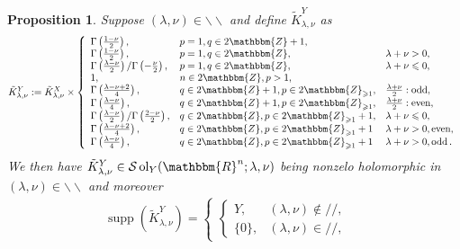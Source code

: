 \documentclass[12pt]{article}
\newcommand{\assign}{:=}
\newcommand{\nin}{\not\in}
\newcommand{\tmop}[1]{\ensuremath{\operatorname{#1}}}
\newtheorem{proposition}{Proposition}[section]
\theoremstyle{remark}
\begin{document}
\begin{proposition}
  \label{supp-sing:prop-supp-Y}Suppose $(\lambda, \nu) \in
  \backslash\backslash$ and define $\tilde{K}_{\lambda, \nu}^Y$ as
  \[ \tilde{K}^Y_{\lambda, \nu} \assign \tilde{K}_{\lambda, \nu}^X \times
     \left\{ \begin{array}{lll}
       \Gamma \left( \frac{1 - \nu}{2} \right), & p = 1, q \in 2\mathbbm{Z}+
       1, & \\
       \Gamma \left( \frac{1 - \nu}{2} \right), & p = 1, q \in 2\mathbbm{Z}, &
       \lambda + \nu > 0,\\
       \Gamma \left( \frac{\lambda - \nu}{2} \right) / \Gamma \left( -
       \frac{\nu}{2} \right), & p = 1, q \in 2\mathbbm{Z}, & \lambda + \nu
       \leqslant 0,\\
       1, & n \in 2\mathbbm{Z}, p > 1, & \\
       \Gamma \left( \frac{\lambda - \nu + 2}{4} \right), & q \in
       2\mathbbm{Z}+ 1, p \in 2\mathbbm{Z}_{\geqslant 1}, & \frac{\lambda +
       \nu}{2} : \tmop{odd},\\
       \Gamma \left( \frac{\lambda - \nu}{4} \right), & q \in 2\mathbbm{Z}+ 1,
       p \in 2\mathbbm{Z}_{\geqslant 1}, & \frac{\lambda + \nu}{2} :
       \tmop{even},\\
       \Gamma \left( \frac{\lambda - \nu}{2} \right) / \Gamma \left( \frac{2 -
       \nu}{2} \right), & q \in 2\mathbbm{Z}, p \in 2\mathbbm{Z}_{\geqslant 1}
       + 1, & \lambda + \nu \leqslant 0,\\
       \Gamma \left( \frac{\lambda - \nu + 2}{4} \right), & q \in
       2\mathbbm{Z}, p \in 2\mathbbm{Z}_{\geqslant 1} + 1 & \lambda + \nu > 0,
       \tmop{even},\\
       \Gamma \left( \frac{\lambda - \nu}{4} \right), & q \in 2\mathbbm{Z}, p
       \in 2\mathbbm{Z}_{\geqslant 1} + 1 & \lambda + \nu > 0, \tmop{odd} .
     \end{array} \right. \]
  We then have $\tilde{K}^Y_{\lambda, \nu} \in \mathcal{S} \tmop{ol}_Y
  (\mathbbm{R}^n ; \lambda, \nu)$ being nonzelo holomorphic in $ (\lambda,
  \nu) \in \backslash\backslash$ and moreover
  \begin{eqnarray}
    & \tmop{supp} (\tilde{K}_{\lambda, \nu}^Y) = \left\{ \begin{array}{ll}
      \left\{ \begin{array}{ll}
        Y, & (\lambda, \nu) \nin / /,\\
        \{ 0 \}, & (\lambda, \nu) \in / /,
      \end{array} \right. & \begin{array}{c}

\end{array}
\end{array}
\end{eqnarray}
\end{proposition}
\end{document}
